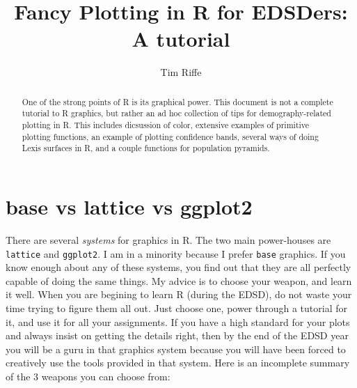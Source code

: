 \documentclass[a4paper]{article}
\begin{document}
\title{Fancy Plotting in R for EDSDers: A tutorial}
\author{Tim Riffe}

\maketitle

\begin{abstract}
One of the strong points of R is its graphical power. This document is not a complete tutorial to R graphics, but rather an ad hoc collection of tips for demography-related plotting in R. This includes dicsussion of color, extensive examples of primitive plotting functions, an example of plotting confidence bands, several ways of doing Lexis surfaces in R, and a couple functions for population pyramids. 
\end{abstract}

\tableofcontents
\listoffigures

\pagebreak
\section{base vs lattice vs ggplot2}
There are several \textit{systems} for graphics in R. The two main power-houses are \texttt{lattice} and \texttt{ggplot2}. I am in a minority because I prefer \texttt{base} graphics. If you know enough about any of these systems, you find out that they are all perfectly capable of doing the same things. My advice is to choose your weapon, and learn it well. When you are begining to learn R (during the EDSD), do not waste your time trying to figure them all out. Just choose one,  power through a tutorial for it, and use it for all your assignments. If you have a high standard for your plots and always insist on getting the details right, then by the end of the EDSD year you will be a guru in that graphics system because you will have been forced to creatively use the tools provided in that system. Here is an incomplete summary of the 3 weapons you can choose from:
\end{document}
